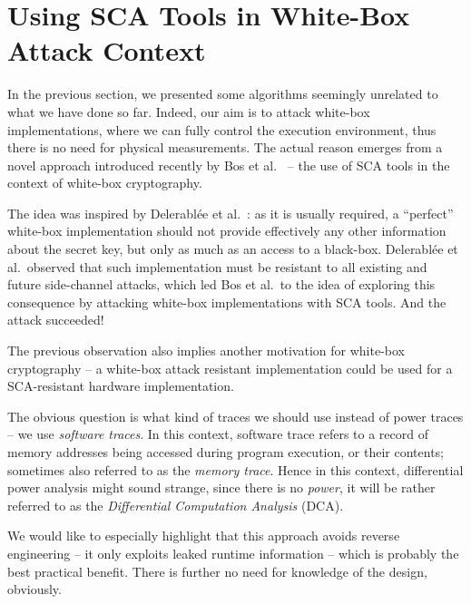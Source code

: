 \section{Using SCA Tools in White-Box Attack Context}
\label{sec:scawbc}

In the previous section, we presented some algorithms seemingly unrelated to what we have done so far. Indeed, our aim is to attack white-box implementations, where we can fully control the execution environment, thus there is no need for physical measurements. The actual reason emerges from a novel approach introduced recently by Bos et al.\ \cite{bos2015differential} -- the use of SCA tools in the context of white-box cryptography.

The idea was inspired by Delerabl{\'e}e et al.\ \cite{delerablee2013white}: as it is usually required, a ``perfect'' white-box implementation should not provide effectively any other information about the secret key, but only as much as an access to a black-box. Delerabl{\'e}e et al.\ observed that such implementation must be resistant to all existing and future side-channel attacks, which led Bos et al.\ to the idea of exploring this consequence by attacking white-box implementations with SCA tools. And the attack succeeded!

\begin{note}
\label{note:motiv}
	The previous observation also implies another motivation for white-box cryptography -- a white-box attack resistant implementation could be used for a SCA-resistant hardware implementation.
\end{note}

The obvious question is what kind of traces we should use instead of power traces -- we use {\em software traces}. In this context, software trace refers to a record of memory addresses being accessed during program execution, or their contents; sometimes also referred to as the {\em memory trace}. Hence in this context, differential power analysis might sound strange, since there is no {\em power}, it will be rather referred to as the {\em Differential Computation Analysis} (DCA).

\begin{remark}
\label{rem:benefit}
	We would like to especially highlight that this approach avoids reverse engineering -- it only exploits leaked runtime information -- which is probably the best practical benefit. There is further no need for knowledge of the design, obviously.
\end{remark}

